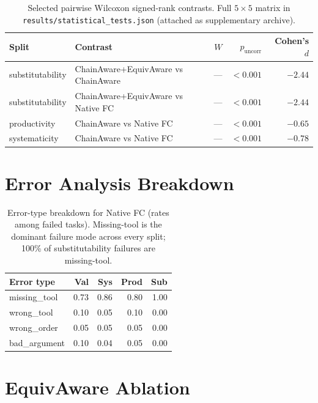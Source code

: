 \documentclass[10pt]{article}
\begin{document}
\begin{table}[h]
    \centering
    \small
    \begin{tabular}{llrrr}
        \toprule
        Split & Contrast & $W$ & $p_{\text{uncorr}}$ & Cohen's $d$ \\
        \midrule
        substitutability & ChainAware+EquivAware vs ChainAware  & --- & $< 0.001$ & $-2.44$ \\
        substitutability & ChainAware+EquivAware vs Native FC    & --- & $< 0.001$ & $-2.44$ \\
        productivity     & ChainAware vs Native FC               & --- & $< 0.001$ & $-0.65$ \\
        systematicity    & ChainAware vs Native FC               & --- & $< 0.001$ & $-0.78$ \\
        \bottomrule
    \end{tabular}
    \caption{Selected pairwise Wilcoxon signed-rank contrasts. Full $5 \times 5$ matrix in \texttt{results/statistical\_tests.json} (attached as supplementary archive).}
    \label{tab:wilcoxon}
\end{table}

\section{Error Analysis Breakdown}
\label{app:errors}

\begin{table}[h]
    \centering
    \small
    \begin{tabular}{lrrrr}
        \toprule
        Error type & Val & Sys & Prod & Sub \\
        \midrule
        missing\_tool  & 0.73 & 0.86 & 0.80 & 1.00 \\
        wrong\_tool    & 0.10 & 0.05 & 0.10 & 0.00 \\
        wrong\_order   & 0.05 & 0.05 & 0.05 & 0.00 \\
        bad\_argument  & 0.10 & 0.04 & 0.05 & 0.00 \\
        \bottomrule
    \end{tabular}
    \caption{Error-type breakdown for Native FC (rates among failed tasks). Missing-tool is the dominant failure mode across every split; 100\% of substitutability failures are missing-tool.}
    \label{tab:errors}
\end{table}

\section{EquivAware Ablation}
\label{app:equiv-ablation}
\end{document}
